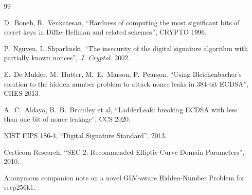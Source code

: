 \documentclass[10pt,a4paper]{article}
\begin{document}
\begin{thebibliography}{99}

 D.~Boneh, R.~Venkatesan, ``Hardness of computing
the most significant bits of secret keys in Diffie--Hellman and
related schemes'', CRYPTO 1996.

 P.~Nguyen, I.~Shparlinski, ``The insecurity of
the digital signature algorithm with partially known nonces'',
\emph{J. Cryptol.} 2002.

 E.~De Mulder, M.~Hutter, M.~E.~Marson,
P.~Pearson, ``Using Bleichenbacher's solution to the hidden number
problem to attack nonce leaks in 384-bit ECDSA'', CHES 2013.

 A.~C.~Aldaya, B.~B.~Brumley et al, ``LadderLeak:
breaking ECDSA with less than one bit of nonce leakage'', CCS 2020.

 NIST FIPS 186-4, ``Digital Signature Standard'',
2013.

 Certicom Research, ``SEC 2: Recommended Elliptic Curve
Domain Parameters'', 2010.

 Anonymous companion note on a novel
GLV-aware Hidden-Number Problem for secp256k1.

\end{thebibliography}
\end{document}

